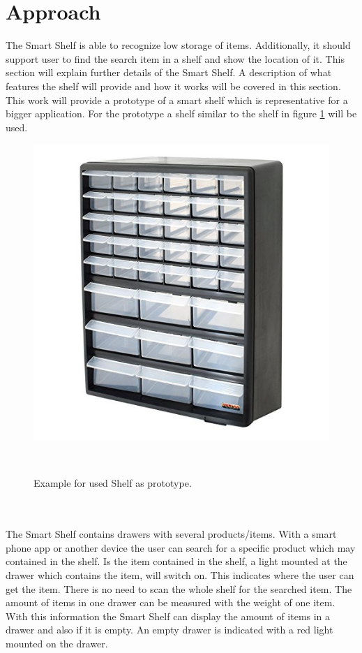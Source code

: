 \documentclass{sigchi}
\begin{document}
\section{Approach}
The Smart Shelf is able to recognize low storage of items. 
Additionally, it should support user to find the search item in a shelf and show the location of it. 
This section will explain further details of the Smart Shelf. 
A description of what features the shelf will provide and how it works will be covered in this section. 
This work will provide a prototype of a smart shelf which is representative for a bigger application. 
For the prototype a shelf similar to the shelf in figure \ref{fig:example_shelf} will be used. 
%
\begin{figure}
	\includegraphics[width=0.9\columnwidth]{figures/example-prototype-shelf}
	\caption{Example for used Shelf as prototype.}~\label{fig:example_shelf}
\end{figure}
%
\\
\\
The Smart Shelf contains drawers with several products/items. 
With a smart phone app or another device the user can search for a specific product which may contained in the shelf. 
Is the item contained in the shelf, a light mounted at the drawer which contains the item, will switch on. 
This indicates where the user can get the item.
There is no need to scan the whole shelf for the searched item. 
The amount of items in one drawer can be measured with the weight of one item. 
With this information the Smart Shelf can display the amount of items in a drawer and also if it is empty. 
An empty drawer is indicated with a red light mounted on the drawer. 
\end{document}
